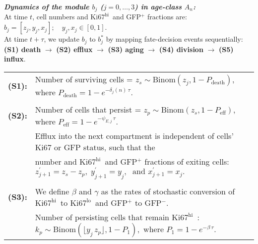 \documentclass[11pt]{article}
\newcommand{\khi}{\ensuremath{\text{Ki67}^\text{hi}}~}
\newcommand{\klo}{\ensuremath{\text{Ki67}^\text{lo}}~}
\begin{document}
\begin{mybox}
\textbf{\textit{Dynamics of the module $b_j$ ($j = 0,\ldots,3$) in age-class $A_n$:}} \\

\vspace{-3mm}
At time $t$, cell numbers and \khi and GFP$^+$ fractions are: $b_j = [z_j, y_j, x_j]; \quad y_j, x_j \in [0, 1]. $ \\ %
At time $t+\tau$, we update $b_j$ to $b_j^*$  by mapping fate-decision events sequentially:\\
\textbf{(S1) death} $\rightarrow$ 
\textbf{(S2) efflux} $\rightarrow$ 
\textbf{(S3) aging} $\rightarrow$ 
\textbf{(S4) division} $\rightarrow$ 
\textbf{(S5) influx}.

\begin{tabular}{ll}
\\
    \textbf{(S1):} &Number of surviving cells =  $z_{s} \sim \text{Binom}(z_j, 1-P_\text{death})$, where $P_\text{death}= 1 - e^{-\delta_{j}(n) \, \tau}$. \\
    \\
    \textbf{(S2):} &Number of cells that persist = $z_{p} \sim \text{Binom}(z_s, 1- P_\text{eff})$, where $P_\text{eff}= 1 - e^{-\psi_{E, j} \, \tau}$. \\
    & Efflux into the next compartment is independent of cells' Ki67 or GFP status, such that the \\
    & number and \khi and GFP$^+$ fractions of exiting cells: $z^{\prime}_{j+1} = z_s - z_p, \; y^{\prime}_{j+1} = y_j, \; \text{ and } x^{\prime}_{j+1} = x_j.$  \\
    \\
    \textbf{(S3):}  & We define $\beta$ and $\gamma$ as the rates of stochastic conversion of \khi to \klo and GFP$^+$ to GFP$^-$. \\ %
    & Number of persisting cells that remain \khi:  $k_{p} \sim \text{Binom}(\lfloor y_j  \, z_{p} \rfloor,  1-P_{1}), \text{ where }P_1 = 1 - e^{-\beta \, \tau}.$ \\

\end{tabular}
\end{mybox}
\end{document}
